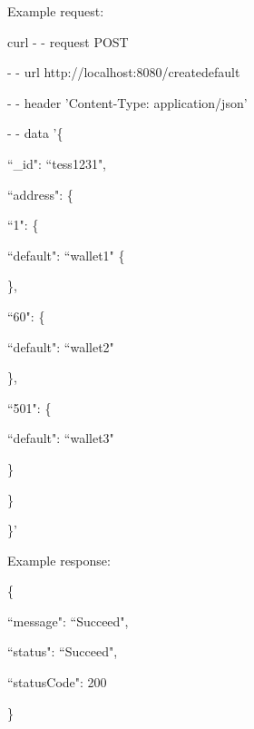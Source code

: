 Example request:

\begin{framed}
\hspace*{13mm}    curl - - request POST \par
\hspace*{13mm}        - - url http://localhost:8080/createdefault \par
\hspace*{13mm}        - - header 'Content-Type: application/json' \par
\hspace*{13mm}        - - data '\{ \par
\hspace*{20mm}                ``\_id": ``tess1231",\par
\hspace*{27mm}                ``address": \{ \par
\hspace*{35mm}                ``1": \{ \par
\hspace*{40mm}                ``default": ``wallet1" \{ \par
\hspace*{40mm}                \}, \par
\hspace*{35mm}                ``60": \{ \par
\hspace*{40mm}                ``default": ``wallet2" \par
\hspace*{40mm}                \}, \par
\hspace*{35mm}                ``501": \{ \par
\hspace*{40mm}                ``default": ``wallet3" \par
\hspace*{40mm}                \} \par
\hspace*{27mm}              \} \par
\hspace*{20mm}            \}' \par
\end{framed}

Example response:

\begin{framed}
    \hspace*{13mm}        \{ \par
    \hspace*{13mm}                ``message": ``Succeed",    \par
    \hspace*{13mm}                ``status": ``Succeed",    \par
    \hspace*{13mm}             ``statusCode": 200    \par
    \hspace*{13mm}                 \}    \par
\end{framed}


